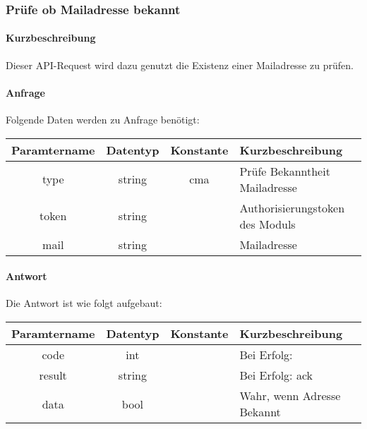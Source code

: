 \subsubsection{Prüfe ob Mailadresse bekannt}
\paragraph{Kurzbeschreibung}Dieser API-Request wird dazu genutzt die Existenz einer Mailadresse zu prüfen.
\paragraph{Anfrage}Folgende Daten werden zu Anfrage benötigt:
\begin{table}[H]
	\begin{tabular}{|c|c|c|p{6.5cm}|}
		\hline
		\textbf{Paramtername} & \textbf{Datentyp} & \textbf{Konstante} & \textbf{Kurzbeschreibung}                                                                                               \\ \hline
		type                & string            & cma                & Prüfe Bekanntheit Mailadresse \\ \hline
		token               & string            &                    & Authorisierungstoken des Moduls \\ \hline
		mail				& string            &                    & Mailadresse \\ \hline
	\end{tabular}
\end{table}
\paragraph{Antwort}Die Antwort ist wie folgt aufgebaut:
\begin{table}[H]
	\begin{tabular}{|c|c|c|p{6.5cm}|}
		\hline
		\textbf{Paramtername} & \textbf{Datentyp} & \textbf{Konstante} & \textbf{Kurzbeschreibung}            \\ \hline                
		code                & int              &                 & Bei Erfolg: {\glqq 0\grqq} \\ \hline
		result              & string           &                 & Bei Erfolg: {\glqq ack\grqq} \\ \hline
		data                & bool             &                 & Wahr, wenn Adresse Bekannt \\ \hline
	\end{tabular}
\end{table}